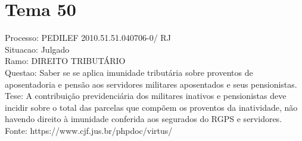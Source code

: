 \documentclass[12pt]{article}
\begin{document}
\section*{Tema 50}
Processo: PEDILEF 2010.51.51.040706-0/ RJ\\
Situacao: Julgado\\
Ramo: DIREITO TRIBUTÁRIO\\
Questao: Saber se se aplica imunidade tributária sobre proventos de aposentadoria e pensão aos servidores militares aposentados e seus pensionistas.\\
Tese: A contribuição previdenciária dos militares inativos e pensionistas deve incidir sobre o total das parcelas que compõem os proventos da inatividade, não havendo direito à imunidade conferida aos segurados do RGPS e servidores.\\
Fonte: https://www.cjf.jus.br/phpdoc/virtus/
\end{document}
